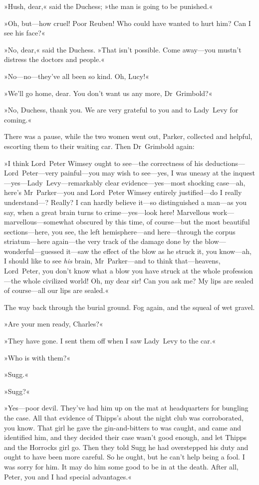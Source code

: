 »Hush, dear,« said the Duchess; »the man is going to be punished.«

»Oh, but—how cruel! Poor Reuben! Who could have wanted to hurt him? Can I see his face?«

»No, dear,« said the Duchess. »That isn't possible. Come away—you mustn't distress the doctors and people.«

»No—no—they've all been so kind. Oh, Lucy!«

»We'll go home, dear. You don't want us any more, Dr~Grimbold?«

»No, Duchess, thank you. We are very grateful to you and to Lady~Levy for coming.«

There was a pause, while the two women went out, Parker, collected and helpful, escorting them to their waiting car. Then Dr~Grimbold again:

»I think Lord~Peter Wimsey ought to see—the correctness of his deductions—Lord~Peter—very painful—you may wish to see—yes, I was uneasy at the inquest—yes—Lady~Levy—remarkably clear evidence—yes—most shocking case—ah, here's Mr~Parker—you and Lord~Peter Wimsey entirely justified—do I really under\-stand---? Really? I can hardly believe it—so distinguished a man—as you say, when a great brain turns to crime—yes—look here! Marvellous work—marvellous—somewhat obscured by this time, of course—but the most beautiful sections—here, you see, the left hemisphere—and here—through the corpus striatum—here again—the very track of the damage done by the blow—wonderful—guessed it—saw the effect of the blow as he struck it, you know—ah, I should like to see \textit{his} brain, Mr~Parker—and to think that—heavens, Lord~Peter, you don't know what a blow you have struck at the whole profession—the whole civilized world! Oh, my dear sir! Can you ask me? My lips are sealed of course—all our lips are sealed.«

The way back through the burial ground. Fog again, and the squeal of wet gravel.

»Are your men ready, Charles?«

»They have gone. I sent them off when I saw Lady~Levy to the car.«

»Who is with them?«

»Sugg.«

»Sugg?«

»Yes—poor devil. They've had him up on the mat at headquarters for bungling the case. All that evidence of Thipps's about the night club was corroborated, you know. That girl he gave the gin-and-bitters to was caught, and came and identified him, and they decided their case wasn't good enough, and let Thipps and the Horrocks girl go. Then they told Sugg he had overstepped his duty and ought to have been more careful. So he ought, but he can't help being a fool. I was sorry for him. It may do him some good to be in at the death. After all, Peter, you and I had special advantages.«

